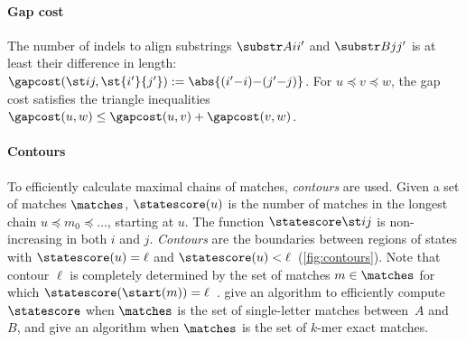 \paragraph{Gap cost}
The number of indels to align substrings $\substr Ai{i'}$ and
$\substr Bj{j'}$ is at least their difference in length: $\gapcost(\st ij,
\st{i'}{j'}):=\abs{(i'{-}i) {-} (j'{-}j)}$. For $u\preceq v\preceq w$, the gap cost
satisfies the triangle inequalities $\gapcost(u, w) \leq \gapcost(u, v) +
\gapcost(v, w)$.

\paragraph{Contours}
To efficiently calculate maximal chains of matches, \emph{contours} are used.
Given a set of matches $\matches$, $\statescore(u)$ is the number of matches in
the longest chain $u\preceq m_0 \preceq \dots$, starting at $u$. The function
$\statescore\st ij$ is non-increasing in both $i$ and $j$. \emph{Contours} are
the boundaries between regions of states with $\statescore(u) = \ell$ and
$\statescore(u)<\ell$~(\cref{fig:contours}). Note that contour $\ell$ is
completely determined by the set of matches $m\in \matches$ for which
${\statescore(\start(m)) = \ell}$~\citep{hirschberg1977algorithms}.
\citet{hunt1977fast} give an algorithm to efficiently compute $\statescore$ when
$\matches$ is the set of single-letter matches between~$A$ and~$B$, and
\citet{deorowicz2014efficient} give an algorithm when $\matches$ is the set of
$k$-mer exact matches.
